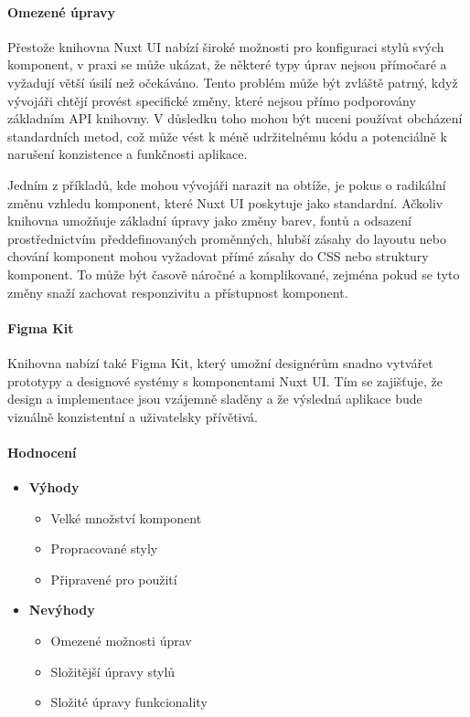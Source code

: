 \paragraph{Omezené úpravy}
Přestože knihovna Nuxt UI nabízí široké možnosti pro konfiguraci stylů svých komponent, v praxi se může ukázat, že některé typy úprav nejsou přímočaré a vyžadují větší úsilí než očekáváno. Tento problém může být zvláště patrný, když vývojáři chtějí provést specifické změny, které nejsou přímo podporovány základním API knihovny. V důsledku toho mohou být nuceni používat obcházení standardních metod, což může vést k méně udržitelnému kódu a potenciálně k narušení konzistence a funkčnosti aplikace.

Jedním z příkladů, kde mohou vývojáři narazit na obtíže, je pokus o radikální změnu vzhledu komponent, které Nuxt UI poskytuje jako standardní. Ačkoliv knihovna umožňuje základní úpravy jako změny barev, fontů a odsazení prostřednictvím předdefinovaných proměnných, hlubší zásahy do layoutu nebo chování komponent mohou vyžadovat přímé zásahy do CSS nebo struktury komponent. To může být časově náročné a komplikované, zejména pokud se tyto změny snaží zachovat responzivitu a přístupnost komponent.

\paragraph{Figma Kit}

Knihovna nabízí také Figma Kit, který umožní designérům snadno vytvářet prototypy a designové systémy s komponentami Nuxt UI. Tím se zajišťuje, že design a implementace jsou vzájemně sladěny a že výsledná aplikace bude vizuálně konzistentní a uživatelsky přívětivá. \cite{NuxtUIFigma}

\paragraph{Hodnocení}

\begin{itemize}
    \item \textbf{Výhody}
    \begin{itemize}
        \item Velké množství komponent
        \item Propracované styly
        \item Připravené pro použití
    \end{itemize}
    \item \textbf{Nevýhody}
    \begin{itemize}
        \item Omezené možnosti úprav
        \item Složitější úpravy stylů
        \item Složité úpravy funkcionality
    \end{itemize}
\end{itemize}

